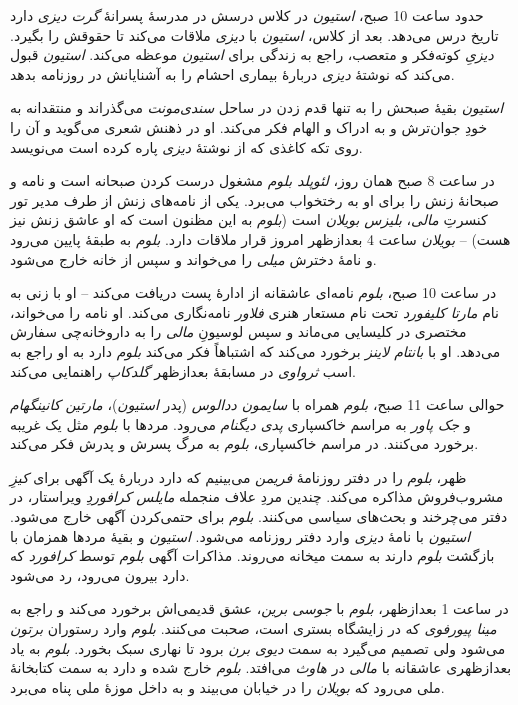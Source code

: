 \documentclass[12pt]{book}
\newcommand{\noun}[1]{\textit{\textcolor{black!70}{#1}}}
\begin{document}
    حدود ساعت 10 صبح، \noun{استیون} در کلاس درسش در مدرسۀ پسرانۀ \noun{گرت دیزی} دارد تاریخ درس می‌دهد. بعد از کلاس، \noun{استیون} با \noun{دیزی} ملاقات می‌کند تا حقوقش را بگیرد. \noun{دیزیِ} کوته‌فکر و متعصب، راجع به زندگی برای \noun{استیون} موعظه می‌کند. \noun{استیون} قبول می‌کند که نوشتۀ \noun{دیزی} دربارۀ بیماری احشام را به آشنایانش در روزنامه بدهد.

    \noun{استیون} بقیۀ صبحش را به تنها قدم زدن در ساحل \noun{سندی‌مونت} می‌گذراند و منتقدانه به خودِ جوان‌ترش و به ادراک و الهام فکر می‌کند. او در ذهنش شعری می‌گوید و آن را روی تکه کاغذی که از نوشتۀ \noun{دیزی} پاره کرده است می‌نویسد.

    در ساعت 8 صبح همان روز، \noun{لئوپلد بلوم} مشغول درست کردن صبحانه است و نامه و صبحانۀ زنش را برای او به رختخواب می‌برد. یکی از نامه‌های زنش از طرف مدیر تور کنسرتِ \noun{مالی}، \noun{بلیزس بویلان} است (\noun{بلوم} به این مظنون است که او عاشق زنش نیز هست) – \noun{بویلان} ساعت 4 بعدازظهر امروز قرار ملاقات دارد. \noun{بلوم} به طبقۀ پایین می‌رود و نامۀ دخترش \noun{میلی} را می‌خواند و سپس از خانه خارج می‌شود.

    در ساعت 10 صبح، \noun{بلوم} نامه‌ای عاشقانه از ادارۀ پست دریافت می‌کند – او با زنی به نام \noun{مارتا کلیفورد} تحت نام مستعار هنری \noun{فلاور} نامه‌نگاری می‌کند. او نامه را می‌خواند، مختصری در کلیسایی می‌ماند و سپس لوسیونِ \noun{مالی} را به داروخانه‌چی سفارش می‌دهد. او با \noun{بانتام لاینز} برخورد می‌کند که اشتباهاً فکر می‌کند \noun{بلوم} دارد به او راجع به اسب \noun{ثرواوی} در مسابقۀ بعدازظهر \noun{گلدکاپ} راهنمایی می‌کند.

    حوالی ساعت 11 صبح، \noun{بلوم} همراه با \noun{سایمون ددالوس} (پدر \noun{استیون})، \noun{مارتین کانینگهام} و \noun{جک پاور} به مراسم خاکسپاری \noun{پدی دیگنام} می‌رود. مردها با \noun{بلوم} مثل یک غریبه برخورد می‌کنند. در مراسم خاکسپاری، \noun{بلوم} به مرگ پسرش و پدرش فکر می‌کند.

    ظهر، \noun{بلوم} را در دفتر روزنامۀ \noun{فریمن} می‌بینیم که دارد دربارۀ یک آگهی برای \noun{کیزِ} مشروب‌فروش مذاکره می‌کند. چندین مردِ علاف منجمله \noun{مایلس کرافوردِ} ویراستار، در دفتر می‌چرخند و بحث‌های سیاسی می‌کنند. \noun{بلوم} برای حتمی‌کردن آگهی خارج می‌شود. \noun{استیون} با نامۀ \noun{دیزی} وارد دفتر روزنامه می‌شود. \noun{استیون} و بقیۀ مردها همزمان با بازگشت \noun{بلوم} دارند به سمت میخانه می‌روند. مذاکرات آگهی \noun{بلوم} توسط \noun{کرافورد} که دارد بیرون می‌رود، رد می‌شود.

    در ساعت 1 بعدازظهر، \noun{بلوم} با \noun{جوسی برین}، عشق قدیمی‌اش برخورد می‌کند و راجع به \noun{مینا پیورفوی} که در زایشگاه بستری است، صحبت می‌کنند. \noun{بلوم} وارد رستوران \noun{برتون} می‌شود ولی تصمیم می‌گیرد به سمت \noun{دیوی برن} برود تا نهاری سبک بخورد. \noun{بلوم} به یاد بعدازظهری عاشقانه با \noun{مالی} در \noun{هاوث} می‌افتد. \noun{بلوم} خارج شده و دارد به سمت کتابخانۀ ملی می‌رود که \noun{بویلان} را در خیابان می‌بیند و به داخل موزۀ ملی پناه می‌برد.
\end{document}
